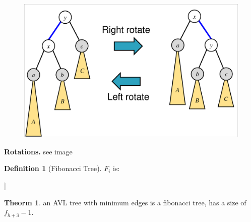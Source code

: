 \documentclass[]{article}
\theoremstyle{definition}
\newtheorem{Theorem}{\color{theoColor}Theorm}
\newtheorem{Definition}{\color{defiColor}Definition}
\newcommand\theo  [1] {\begin{Theorem}#1\end{Theorem}}
\begin{document}
\begin{multicols}{4}
				\begin{figure}
					\includegraphics[width=\linewidth]{images/rotations}
					\vspace{-20pt}
				\end{figure}
				\textbf{Rotations. }see image
				\begin{Definition}[Fibonacci Tree]
					$F_i$ is: \\ \vspace{3pt} \begin{center}
						\begin{forest}
							[$F_i$ [$F_{i -1}$] [$F_{i - 2}$]]
						\end{forest}
					\end{center}
				\end{Definition}\vspace{2pt}
				\theo{an AVL tree with minimum edges is a fibonacci tree, has a size of $f_{h + 3} - 1$. }
				

\end{multicols}
\end{document}
